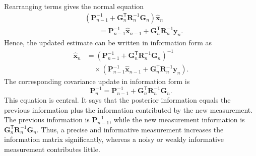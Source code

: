 \documentclass[11pt,oneside,openany]{book}
\begin{document}
Rearranging terms gives the normal equation
\begin{align*}
&\left(\mathbf{P}_{n-1}^{-1}+\mathbf{G}_n^{\mathsf T}\mathbf{R}_n^{-1}\mathbf{G}_n\right)\widehat{\mathbf{x}}_n\\
&\qquad=
\mathbf{P}_{n-1}^{-1}\widehat{\mathbf{x}}_{n-1}
+\mathbf{G}_n^{\mathsf T}\mathbf{R}_n^{-1}\mathbf{y}_n.
\end{align*}
Hence, the updated estimate can be written in information form as
\begin{equation}
\begin{aligned}
\widehat{\mathbf{x}}_n
&=
\left(
\mathbf{P}_{n-1}^{-1}
+
\mathbf{G}_n^{\mathsf T}
\mathbf{R}_n^{-1}
\mathbf{G}_n
\right)^{-1}\\
&\quad{}\times
\left(
\mathbf{P}_{n-1}^{-1}
\widehat{\mathbf{x}}_{n-1}
+
\mathbf{G}_n^{\mathsf T}
\mathbf{R}_n^{-1}
\mathbf{y}_n
\right).
\end{aligned}
\end{equation}
The corresponding covariance update in information form is
\begin{equation}
\mathbf{P}_n^{-1}
=
\mathbf{P}_{n-1}^{-1}
+
\mathbf{G}_n^{\mathsf T}
\mathbf{R}_n^{-1}
\mathbf{G}_n.
\end{equation}
This equation is central. It says that the posterior information equals the previous information plus the information contributed by the new measurement. The previous information is $\mathbf{P}_{n-1}^{-1}$, while the new measurement information is $\mathbf{G}_n^{\mathsf T}\mathbf{R}_n^{-1}\mathbf{G}_n$. Thus, a precise and informative measurement increases the information matrix significantly, whereas a noisy or weakly informative measurement contributes little.
\end{document}
